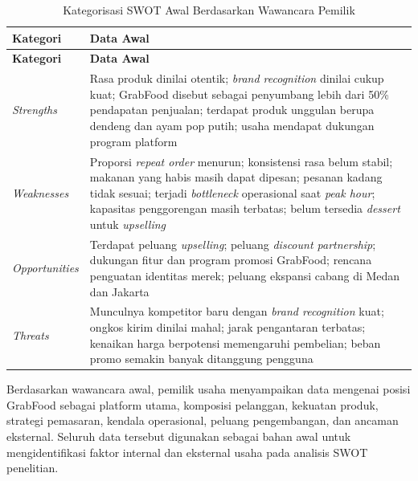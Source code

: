 \begingroup
\begin{xltabular}{\textwidth}{|Z{3.4cm}|Y|}
\caption{Kategorisasi SWOT Awal Berdasarkan Wawancara Pemilik}
\label{tab:swot_wawancara_awal} \\
        \toprule
        \textbf{Kategori}      & \textbf{Data Awal}                                                                                                                                                                                                                                                                                           \\ \hline
        \midrule
\endfirsthead
{}
        \toprule
        \textbf{Kategori}      & \textbf{Data Awal}                                                                                                                                                                                                                                                                                           \\ \hline
        \midrule
\endhead
{}
\endfoot
        \bottomrule
        \endlastfoot
        \textit{Strengths}     & Rasa produk dinilai otentik; \textit{brand recognition} dinilai cukup kuat; GrabFood disebut sebagai penyumbang lebih dari 50\% pendapatan penjualan; terdapat produk unggulan berupa dendeng dan ayam pop putih; usaha mendapat dukungan program platform                                                       \\ \hline
        \textit{Weaknesses}    & Proporsi \textit{repeat order} menurun; konsistensi rasa belum stabil; makanan yang habis masih dapat dipesan; pesanan kadang tidak sesuai; terjadi \textit{bottleneck} operasional saat \textit{peak hour}; kapasitas penggorengan masih terbatas; belum tersedia \textit{dessert} untuk \textit{upselling} \\ \hline
        \textit{Opportunities} & Terdapat peluang \textit{upselling}; peluang \textit{discount partnership}; dukungan fitur dan program promosi GrabFood; rencana penguatan identitas merek; peluang ekspansi cabang di Medan dan Jakarta                                                                                                     \\ \hline
        \textit{Threats}       & Munculnya kompetitor baru dengan \textit{brand recognition} kuat; ongkos kirim dinilai mahal; jarak pengantaran terbatas; kenaikan harga berpotensi memengaruhi pembelian; beban promo semakin banyak ditanggung pengguna                                                                                    \\ \hline
        \bottomrule
    
\end{xltabular}
\endgroup
Berdasarkan wawancara awal, pemilik usaha menyampaikan data mengenai posisi GrabFood sebagai platform utama, komposisi pelanggan, kekuatan produk, strategi pemasaran, kendala operasional, peluang pengembangan, dan ancaman eksternal. Seluruh data tersebut digunakan sebagai bahan awal untuk mengidentifikasi faktor internal dan eksternal usaha pada analisis SWOT penelitian.

